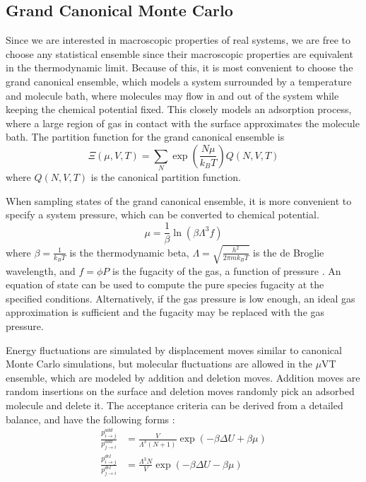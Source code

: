 \documentclass{article}
\begin{document}
\subsection{Grand Canonical Monte Carlo}
Since we are interested in macroscopic properties of real systems, we are free to choose any statistical ensemble since their macroscopic properties are equivalent in the thermodynamic limit.
Because of this, it is most convenient to choose the grand canonical ensemble, which models a system surrounded by a temperature and molecule bath, where molecules may flow in and out of the system while keeping the chemical potential fixed.
This closely models an adsorption process, where a large region of gas in contact with the surface approximates the molecule bath. The partition function for the grand canonical ensemble is
\begin{equation}
    \Xi(\mu, V, T) = \sum_N \exp\left(\frac{N\mu}{k_BT}\right)Q(N, V, T)
    \label{gc-partition}
\end{equation}
where $Q(N, V, T)$ is the canonical partition function.

When sampling states of the grand canonical ensemble, it is more convenient to specify a system pressure, which can be converted to chemical potential.
\begin{equation}
    \mu = \frac{1}{\beta}\ln\left(\beta\Lambda^3f\right)
\end{equation}
where $\beta = \frac{1}{k_BT}$ is the thermodynamic beta, $\Lambda = \sqrt{\frac{h^2}{2\pi mk_BT}}$ is the de Broglie wavelength, and $f = \phi P$ is the fugacity of the gas, a function of pressure \cite{h2-storage}. An equation of state can be used to compute the pure species fugacity at the specified conditions. Alternatively, if the gas pressure is low enough, an ideal gas approximation is sufficient and the fugacity may be replaced with the gas pressure.

Energy fluctuations are simulated by displacement moves similar to canonical Monte Carlo simulations, but molecular fluctuations are allowed in the $\mu$VT ensemble, which are modeled by addition and deletion moves. Addition moves are random insertions on the surface and deletion moves randomly pick an adsorbed molecule and delete it. The acceptance criteria can be derived from a detailed balance, and have the following forms \cite{mol-sim}:
\begin{align}
    \frac{p^\textit{add}_{i\to j}}{p^\textit{add}_{j\to i}} &= \frac{V}{\Lambda^3(N+1)}\exp(-\beta\Delta U + \beta\mu) \\
    \frac{p^\textit{del}_{i\to j}}{p^\textit{del}_{j\to i}} &= \frac{\Lambda^3N}{V}\exp(-\beta\Delta U - \beta\mu)
\end{align}
\end{document}
